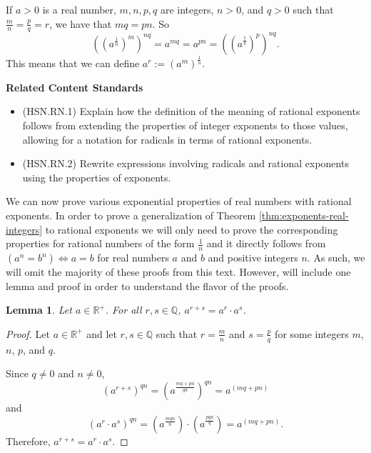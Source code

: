 \documentclass[
]{book}
\providecommand{\tightlist}{%
  \setlength{\itemsep}{0pt}\setlength{\parskip}{0pt}}
\newenvironment{standards}{}{}
\newtheorem{lemma}{Lemma}[chapter]
\theoremstyle{definition}
\theoremstyle{definition}
\theoremstyle{definition}
\theoremstyle{definition}
\theoremstyle{remark}
\begin{document}
If \(a>0\) is a real number, \(m,n,p,q\) are integers, \(n>0\), and \(q>0\) such that \(\frac{m}{n}=\frac{p}{q}=r\), we have that \(mq=pn\). So \[\left(\left(a^{\frac{1}{n}}\right)^m\right)^{nq} = a^{mq} = a^{pn} = \left( \left( a^{\frac{1}{q}} \right)^p \right)^{nq}.\] This means that we can define \(a^r:=\left(a^m\right)^{\frac{1}{n}}\).

\begin{standards}

\begin{center}
\textbf{Related Content Standards}

\end{center}

\begin{itemize}
\tightlist
\item
  (HSN.RN.1) Explain how the definition of the meaning of rational exponents follows from extending the properties of integer exponents to those values, allowing for a notation for radicals in terms of rational exponents.
\item
  (HSN.RN.2) Rewrite expressions involving radicals and rational exponents using the properties of exponents.\\
\end{itemize}

\end{standards}

We can now prove various exponential properties of real numbers with rational exponents. In order to prove a generalization of Theorem \ref{thm:exponents-real-integers} to rational exponents we will only need to prove the corresponding properties for rational numbers of the form \(\frac{1}{n}\) and it directly follows from \((a^n=b^n) \Leftrightarrow a=b\) for real numbers \(a\) and \(b\) and positive integers \(n\). As such, we will omit the majority of these proofs from this text. However, will include one lemma and proof in order to understand the flavor of the proofs.

\begin{lemma}
Let \(a\in \mathbb{R}^+\). For all \(r,s\in \mathbb{Q}\), \(a^{r+s}=a^r\cdot a^s\).
\end{lemma}

\begin{proof}
Let \(a\in \mathbb{R}^+\) and let \(r,s\in \mathbb{Q}\) such that \(r=\frac{m}{n}\) and \(s=\frac{p}{q}\) for some integers \(m\), \(n\), \(p\), and \(q\).

Since \(q\neq 0\) and \(n\neq 0\),
\[\left(a^{r+s}\right)^{qn} = \left( a^{\frac{mq+pn}{qn}}\right)^{qn} = a^{(mq+pn)}\] and
\[\left(a^r\cdot a^s\right)^{qn} = \left(a^{\frac{mqn}{n}}\right)\cdot \left(a^{\frac{pqn}{q}}\right) = a^{(mq+pn)}.\] Therefore, \(a^{r+s}=a^r\cdot a^s\).
\end{proof}
\end{document}
